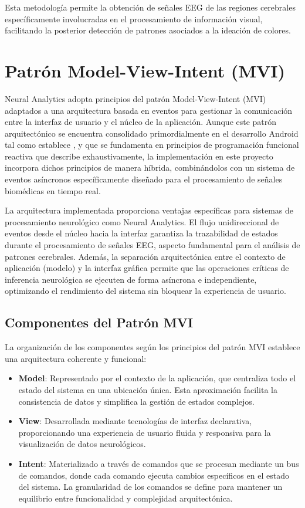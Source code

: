 Esta metodología permite la obtención de señales EEG de las regiones cerebrales específicamente involucradas en el procesamiento de información visual, facilitando la posterior detección de patrones asociados a la ideación de colores.

\section{Patrón Model-View-Intent (MVI)}

Neural Analytics adopta principios del patrón Model-View-Intent (MVI) adaptados a una arquitectura basada en eventos para gestionar la comunicación entre la interfaz de usuario y el núcleo de la aplicación. Aunque este patrón arquitectónico se encuentra consolidado primordialmente en el desarrollo Android tal como establece \cite{dumbravan2022clean}, y que se fundamenta en principios de programación funcional reactiva que \cite{blackheath2016functional} describe exhaustivamente, la implementación en este proyecto incorpora dichos principios de manera híbrida, combinándolos con un sistema de eventos asíncronos específicamente diseñado para el procesamiento de señales biomédicas en tiempo real.

La arquitectura implementada proporciona ventajas específicas para sistemas de procesamiento neurológico como Neural Analytics. El flujo unidireccional de eventos desde el núcleo hacia la interfaz garantiza la trazabilidad de estados durante el procesamiento de señales EEG, aspecto fundamental para el análisis de patrones cerebrales. Además, la separación arquitectónica entre el contexto de aplicación (modelo) y la interfaz gráfica permite que las operaciones críticas de inferencia neurológica se ejecuten de forma asíncrona e independiente, optimizando el rendimiento del sistema sin bloquear la experiencia de usuario.

\subsection{Componentes del Patrón MVI}

La organización de los componentes según los principios del patrón MVI establece una arquitectura coherente y funcional:

\begin{itemize}
    \item \textbf{Model}: Representado por el contexto de la aplicación, que centraliza todo el estado del sistema en una ubicación única. Esta aproximación facilita la consistencia de datos y simplifica la gestión de estados complejos.
    \item \textbf{View}: Desarrollada mediante tecnologías de interfaz declarativa, proporcionando una experiencia de usuario fluida y responsiva para la visualización de datos neurológicos.
    \item \textbf{Intent}: Materializado a través de comandos que se procesan mediante un bus de comandos, donde cada comando ejecuta cambios específicos en el estado del sistema. La granularidad de los comandos se define para mantener un equilibrio entre funcionalidad y complejidad arquitectónica.
\end{itemize}

